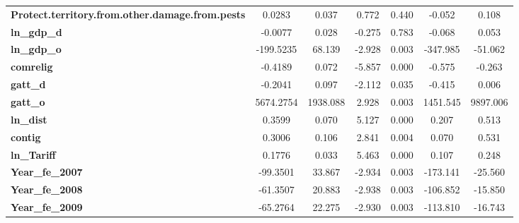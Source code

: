 \begin{center}
\begin{tabular}{lcccccc}
\textbf{Protect.territory.from.other.damage.from.pests}            &       0.0283  &        0.037     &     0.772  &         0.440        &       -0.052    &        0.108     \\
\textbf{ln\_gdp\_d}                                                &      -0.0077  &        0.028     &    -0.275  &         0.783        &       -0.068    &        0.053     \\
\textbf{ln\_gdp\_o}                                                &    -199.5235  &       68.139     &    -2.928  &         0.003        &     -347.985    &      -51.062     \\
\textbf{comrelig}                                                  &      -0.4189  &        0.072     &    -5.857  &         0.000        &       -0.575    &       -0.263     \\
\textbf{gatt\_d}                                                   &      -0.2041  &        0.097     &    -2.112  &         0.035        &       -0.415    &        0.006     \\
\textbf{gatt\_o}                                                   &    5674.2754  &     1938.088     &     2.928  &         0.003        &     1451.545    &     9897.006     \\
\textbf{ln\_dist}                                                  &       0.3599  &        0.070     &     5.127  &         0.000        &        0.207    &        0.513     \\
\textbf{contig}                                                    &       0.3006  &        0.106     &     2.841  &         0.004        &        0.070    &        0.531     \\
\textbf{ln\_Tariff}                                                &       0.1776  &        0.033     &     5.463  &         0.000        &        0.107    &        0.248     \\
\textbf{Year\_fe\_2007}                                            &     -99.3501  &       33.867     &    -2.934  &         0.003        &     -173.141    &      -25.560     \\
\textbf{Year\_fe\_2008}                                            &     -61.3507  &       20.883     &    -2.938  &         0.003        &     -106.852    &      -15.850     \\
\textbf{Year\_fe\_2009}                                            &     -65.2764  &       22.275     &    -2.930  &         0.003        &     -113.810    &      -16.743     \\

\end{tabular}
\end{center}
